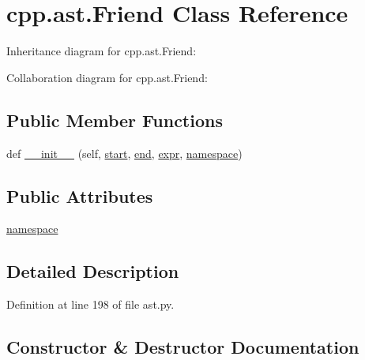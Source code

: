 \hypertarget{classcpp_1_1ast_1_1_friend}{}\section{cpp.\+ast.\+Friend Class Reference}
\label{classcpp_1_1ast_1_1_friend}


Inheritance diagram for cpp.\+ast.\+Friend\+:


Collaboration diagram for cpp.\+ast.\+Friend\+:
\subsection*{Public Member Functions}
\begin{DoxyCompactItemize}
\item 
def \hyperlink{classcpp_1_1ast_1_1_friend_a9fe245d0f14eaab85435e942a56de7e6}{\+\_\+\+\_\+init\+\_\+\+\_\+} (self, \hyperlink{classcpp_1_1ast_1_1_node_a7b2aa97e6a049bb1a93aea48c48f1f44}{start}, \hyperlink{classcpp_1_1ast_1_1_node_a3c5e5246ccf619df28eca02e29d69647}{end}, \hyperlink{classcpp_1_1ast_1_1_expr_a2f4e13fb0176f2616f8703103c806462}{expr}, \hyperlink{classcpp_1_1ast_1_1_friend_a076c68dddae9bd1e24d224d005538014}{namespace})
\end{DoxyCompactItemize}
\subsection*{Public Attributes}
\begin{DoxyCompactItemize}
\item 
\hyperlink{classcpp_1_1ast_1_1_friend_a076c68dddae9bd1e24d224d005538014}{namespace}
\end{DoxyCompactItemize}


\subsection{Detailed Description}


Definition at line 198 of file ast.\+py.



\subsection{Constructor \& Destructor Documentation}

